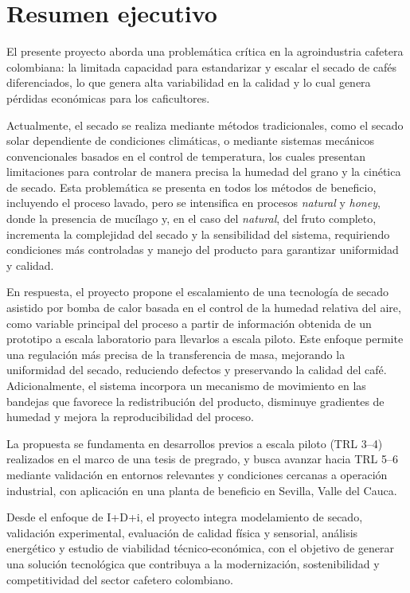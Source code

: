 \section{Resumen ejecutivo}

El presente proyecto aborda una problemática crítica en la agroindustria cafetera colombiana: la limitada capacidad para estandarizar y escalar el secado de cafés diferenciados, lo que genera alta variabilidad en la calidad y lo cual genera pérdidas económicas para los caficultores.

Actualmente, el secado se realiza mediante métodos tradicionales, como el secado solar dependiente de condiciones climáticas, o mediante sistemas mecánicos convencionales basados en el control de temperatura, los cuales presentan limitaciones para controlar de manera precisa la humedad del grano y la cinética de secado. Esta problemática se presenta en todos los métodos de beneficio, incluyendo el proceso lavado, pero se intensifica en procesos \textit{natural} y \textit{honey}, donde la presencia de mucílago y, en el caso del \textit{natural}, del fruto completo, incrementa la complejidad del secado y la sensibilidad del sistema, requiriendo condiciones más controladas y manejo del producto para garantizar uniformidad y calidad.

En respuesta, el proyecto propone el escalamiento de una tecnología de secado asistido por bomba de calor basada en el control de la humedad relativa del aire, como variable principal del proceso a partir de información obtenida de un prototipo a escala laboratorio para llevarlos a escala piloto. Este enfoque permite una regulación más precisa de la transferencia de masa, mejorando la uniformidad del secado, reduciendo defectos y preservando la calidad del café. Adicionalmente, el sistema incorpora un mecanismo de movimiento en las bandejas que favorece la redistribución del producto, disminuye gradientes de humedad y mejora la reproducibilidad del proceso.

La propuesta se fundamenta en desarrollos previos a escala piloto (TRL 3--4) realizados en el marco de una tesis de pregrado, y busca avanzar hacia TRL 5--6 mediante validación en entornos relevantes y condiciones cercanas a operación industrial, con aplicación en una planta de beneficio en Sevilla, Valle del Cauca.

Desde el enfoque de I+D+i, el proyecto integra modelamiento de secado, validación experimental, evaluación de calidad física y sensorial, análisis energético y estudio de viabilidad técnico-económica, con el objetivo de generar una solución tecnológica que contribuya a la modernización, sostenibilidad y competitividad del sector cafetero colombiano.